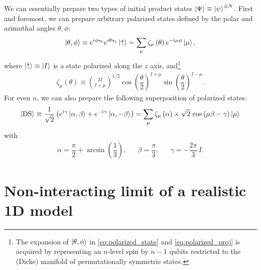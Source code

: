 \documentclass[nofootinbib,notitlepage,11pt]{revtex4-2}
\newcommand{\f}[2]{\dfrac{#1}{#2}} %
\newcommand{\p}[1]{\left(#1\right)} %
\renewcommand{\i}{\mathrm{i}\mkern1mu} %
\newcommand{\1}{\mathds{1}}
\newcommand{\up}{\uparrow}
\newcommand{\y}{\text{y}}
\newcommand{\z}{\text{z}}
\newcommand{\DS}{\text{DS}}
\begin{document}
We can essentially prepare two types of initial product states
$\ket\Psi\equiv\ket\psi^{\otimes N}$.  First and foremost, we can
prepare arbitrary polarized states defined by the polar and azimuthal
angles $\theta,\phi$:
\begin{align}
  \ket{\theta,\phi}
  \equiv e^{i\phi s_\z} e^{i\theta s_\y} \ket\up
  = \sum_\mu \zeta_\mu\p{\theta} e^{-\i\mu\phi} \ket\mu,
  \label{eq:polarized_state}
\end{align}
where $\ket\up\equiv\ket{I}$ is a state polarized along the $z$ axis,
and\footnote{The expansion of $\ket{\theta,\phi}$ in
  \eqref{eq:polarized_state} and \eqref{eq:polarized_proj} is acquired
  by representing an $n$-level spin by $n-1$ qubits restricted to the
  (Dicke) manifold of permutationally symmetric states.}
\begin{align}
  \zeta_\mu\p{\theta} \equiv { 2I \choose I+\mu }^{1/2}
  \cos\p{\f{\theta}{2}}^{I+\mu} \sin\p{\f{\theta}{2}}^{I-\mu}.
  \label{eq:polarized_proj}
\end{align}
For even $n$, we can also prepare the following superposition of
polarized states:
\begin{align}
  \ket{\DS}
  \equiv \f1{\sqrt{2}}
  \p{e^{\i\gamma} \ket{\alpha,\beta}
    + e^{-\i\gamma} \ket{\alpha,-\beta}}
  = \sum_\mu \zeta_\mu\p{\alpha}
  \times \sqrt{2}\, \cos\p{\mu\beta-\gamma} \ket\mu
  \label{eq:double_state}
\end{align}
with
\begin{align}
  \alpha = \f{\pi}{2} + \arcsin\p{\f13},
  &&
  \beta = \f{\pi}{3},
  &&
  \gamma = -\f{2\pi}{3}\, I.
\end{align}

\section{Non-interacting limit of a realistic 1D model}
\end{document}

